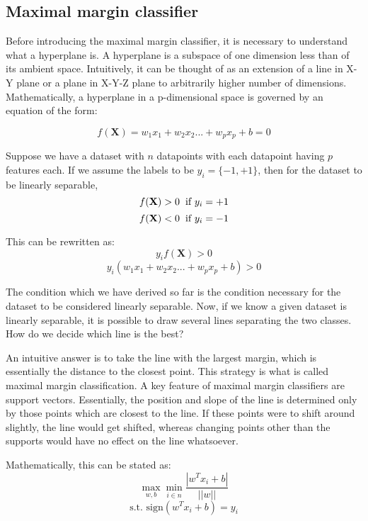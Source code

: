 \documentclass[conference]{IEEEtran}
\begin{document}
\subsection{Maximal margin classifier}

Before introducing the maximal margin classifier, it is necessary to understand what a hyperplane is. A hyperplane is a subspace of one dimension less than of its ambient space. Intuitively, it can be thought of as an extension of a line in X-Y plane or a plane in X-Y-Z plane to arbitrarily higher number of dimensions. Mathematically, a hyperplane in a p-dimensional space is governed by an equation of the form:

$$ f(\mathbf{X}) = w_1x_1 + w_2x_2 ... + w_px_p + b = 0 $$

Suppose we have a dataset with $n$ datapoints with each datapoint having $p$ features each. If we assume the labels to be $y_i = \{-1, +1\}$, then for the dataset to be linearly separable,
$$ f(\mathbf{X}) > 0 \hspace{0.2cm} \textrm{if } y_i = +1  $$
$$ f(\mathbf{X}) < 0 \hspace{0.2cm} \textrm{if } y_i = -1  $$

This can be rewritten as:
$$ y_if(\mathbf{X}) > 0 $$
$$ y_i(w_1x_1 + w_2x_2 ... + w_px_p + b) > 0 $$

The condition which we have derived so far is the condition necessary for the dataset to be considered linearly separable. Now, if we know a given dataset is linearly separable, it is possible to draw several lines separating the two classes. How do we decide which line is the best?

An intuitive answer is to take the line with the largest margin, which is essentially the distance to the closest point. This strategy is what is called maximal margin classification. A key feature of maximal margin classifiers are support vectors. Essentially, the position and slope of the line is determined only by those points which are closest to the line. If these points were to shift around slightly, the line would get shifted, whereas changing points other than the supports would have no effect on the line whatsoever.

Mathematically, this can be stated as:
\begin{equation*}
    \max_{w, b} \min_{i \in n} \frac{|w^Tx_i + b|}{||w||} 
\end{equation*}
\begin{equation*}
    \textrm{s.t. sign}(w^Tx_i + b) = y_i
\end{equation*}
\end{document}
